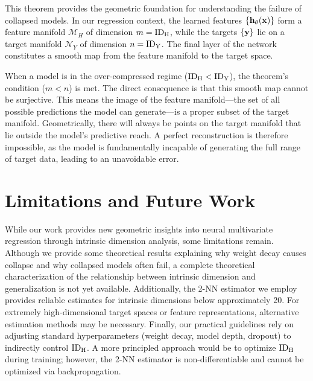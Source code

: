 This theorem provides the geometric foundation for understanding the failure of collapsed models. In our regression context, the learned features $\{{\mathbf h}_\theta({\mathbf x})\}$ form a feature manifold $\mathcal{M}_H$ of dimension $m = \mathrm{ID}_{\mathrm{H}}$, while the targets $\{{\mathbf y}\}$ lie on a target manifold $\mathcal{N}_Y$ of dimension $n = \mathrm{ID}_{\mathrm{Y}}$. The final layer of the network constitutes a smooth map from the feature manifold to the target space.

When a model is in the over-compressed regime ($\mathrm{ID}_{\mathrm{H}} < \mathrm{ID}_{\mathrm{Y}}$), the theorem's condition ($m < n$) is met. The direct consequence is that this smooth map cannot be surjective. This means the image of the feature manifold---the set of all possible predictions the model can generate---is a proper subset of the target manifold. Geometrically, there will always be points on the target manifold that lie outside the model's predictive reach. A perfect reconstruction is therefore impossible, as the model is fundamentally incapable of generating the full range of target data, leading to an unavoidable error.


\section{Limitations and Future Work}
\label{appx:limitation}
While our work provides new geometric insights into neural multivariate regression through intrinsic dimension analysis, some limitations remain. Although we provide some theoretical results explaining why weight decay causes collapse and why collapsed models often fail, a complete theoretical characterization of the relationship between intrinsic dimension and generalization is not yet available. Additionally, the 2-NN estimator we employ provides reliable estimates for intrinsic dimensions below approximately 20. For extremely high-dimensional target spaces or feature representations, alternative estimation methods may be necessary. Finally, our practical guidelines rely on adjusting standard hyperparameters (weight decay, model depth, dropout) to indirectly control $\mathrm{ID}_{\mathrm{H}}$. A more principled approach would be to optimize $\mathrm{ID}_{\mathrm{H}}$ during training; however, the 2-NN estimator is non-differentiable and cannot be optimized via backpropagation.

